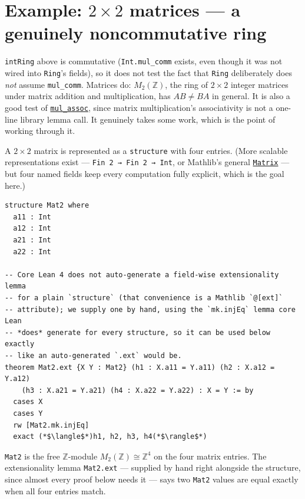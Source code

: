 \section{\texorpdfstring{Example: \(2\times 2\) matrices --- a genuinely noncommutative ring}{Example: 2\textbackslash times 2 matrices --- a genuinely noncommutative ring}}\label{sec:08-rings:07-matrices:1}

\texttt{intRing} above is commutative (\texttt{Int.mul\_\allowbreak{}comm} exists, even though it was not wired into \texttt{Ring}'s fields), so it does not test the fact that \texttt{Ring} deliberately does \emph{not} assume \texttt{mul\_\allowbreak{}comm}. Matrices do: \(M_2(\mathbb{Z})\), the ring of \(2\times 2\) integer matrices under matrix addition and multiplication, has \(AB \neq BA\) in general. It is also a good test of \href{https://loogle.lean-lang.org/?q=mul_assoc}{\texttt{mul\_\allowbreak{}assoc}}, since matrix multiplication's associativity is not a one-line library lemma call. It genuinely takes some work, which is the point of working through it.

A \(2 \times 2\) matrix is represented as a \texttt{structure} with four entries. (More scalable representations exist --- \texttt{Fin 2 → Fin 2 → Int}, or Mathlib's general \href{https://loogle.lean-lang.org/?q=Matrix}{\texttt{Matrix}} --- but four named fields keep every computation fully explicit, which is the goal here.)

\begin{lstlisting}
structure Mat2 where
  a11 : Int
  a12 : Int
  a21 : Int
  a22 : Int

-- Core Lean 4 does not auto-generate a field-wise extensionality lemma
-- for a plain `structure` (that convenience is a Mathlib `@[ext]`
-- attribute); we supply one by hand, using the `mk.injEq` lemma core Lean
-- *does* generate for every structure, so it can be used below exactly
-- like an auto-generated `.ext` would be.
theorem Mat2.ext {X Y : Mat2} (h1 : X.a11 = Y.a11) (h2 : X.a12 = Y.a12)
    (h3 : X.a21 = Y.a21) (h4 : X.a22 = Y.a22) : X = Y := by
  cases X
  cases Y
  rw [Mat2.mk.injEq]
  exact (*$\langle$*)h1, h2, h3, h4(*$\rangle$*)
\end{lstlisting}

\begin{mathreading}

\texttt{Mat2} is the free \(\mathbb{Z}\)-module \(M_2(\mathbb{Z}) \cong \mathbb{Z}^4\) on the four matrix entries. The extensionality lemma \texttt{Mat2.ext} --- supplied by hand right alongside the structure, since almost every proof below needs it --- says two \texttt{Mat2} values are equal exactly when all four entries match.

\end{mathreading}

